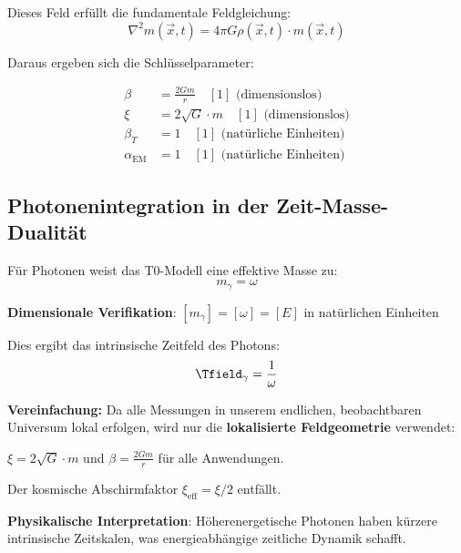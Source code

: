 	Dieses Feld erfüllt die fundamentale Feldgleichung:
	\begin{equation}
		\nabla^2 m(\vec{x},t) = 4\pi G \rho(\vec{x},t) \cdot m(\vec{x},t)
		\label{eq:field_equation}
	\end{equation}
	
	Daraus ergeben sich die Schlüsselparameter:
	
	\begin{tcolorbox}[colback=blue!5!white,colframe=blue!75!black,title=T0-Modell-Parameter für Photonenanalyse]
		\begin{align}
			\beta &= \frac{2Gm}{r} \quad [1] \text{ (dimensionslos)} \\
			\xi &= 2\sqrt{G} \cdot m \quad [1] \text{ (dimensionslos)} \\
			\beta_T &= 1 \quad [1] \text{ (natürliche Einheiten)} \\
			\alpha_{\text{EM}} &= 1 \quad [1] \text{ (natürliche Einheiten)}
		\end{align}
	\end{tcolorbox}
	
	\subsection{Photonenintegration in der Zeit-Masse-Dualität}
	
	Für Photonen weist das T0-Modell eine effektive Masse zu:
	\begin{equation}
		m_\gamma = \omega
		\label{eq:photon_effective_mass}
	\end{equation}
	
	\textbf{Dimensionale Verifikation}: $[m_\gamma] = [\omega] = [E]$ in natürlichen Einheiten \checkmark
	
	Dies ergibt das intrinsische Zeitfeld des Photons:
	\begin{equation}
		\Tfield_\gamma = \frac{1}{\omega}
		\label{eq:photon_time_field}
	\end{equation}
	
	\begin{tcolorbox}[colback=yellow!5!white,colframe=orange!75!black,title=Praktische Vereinfachung]
		\textbf{Vereinfachung:} Da alle Messungen in unserem endlichen, beobachtbaren Universum lokal erfolgen, wird nur die \textbf{lokalisierte Feldgeometrie} verwendet:
		
		$\xi = 2\sqrt{G} \cdot m$ und $\beta = \frac{2Gm}{r}$ für alle Anwendungen.
		
		Der kosmische Abschirmfaktor $\xi_{\text{eff}} = \xi/2$ entfällt.
	\end{tcolorbox}	
	\textbf{Physikalische Interpretation}: Höherenergetische Photonen haben kürzere intrinsische Zeitskalen, was energieabhängige zeitliche Dynamik schafft.
	
